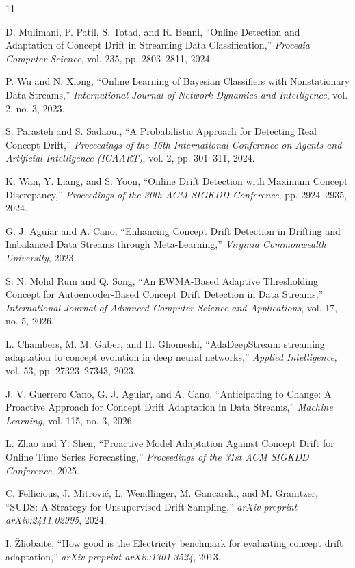 \documentclass[conference]{IEEEtran}
\begin{document}
\begin{thebibliography}{11}
\footnotesize

D. Mulimani, P. Patil, S. Totad, and R. Benni, ``Online Detection and Adaptation of Concept Drift in Streaming Data Classification,'' \textit{Procedia Computer Science}, vol. 235, pp. 2803--2811, 2024.

P. Wu and N. Xiong, ``Online Learning of Bayesian Classifiers with Nonstationary Data Streams,'' \textit{International Journal of Network Dynamics and Intelligence}, vol. 2, no. 3, 2023.

S. Parasteh and S. Sadaoui, ``A Probabilistic Approach for Detecting Real Concept Drift,'' \textit{Proceedings of the 16th International Conference on Agents and Artificial Intelligence (ICAART)}, vol. 2, pp. 301--311, 2024.

K. Wan, Y. Liang, and S. Yoon, ``Online Drift Detection with Maximum Concept Discrepancy,'' \textit{Proceedings of the 30th ACM SIGKDD Conference}, pp. 2924--2935, 2024.

G. J. Aguiar and A. Cano, ``Enhancing Concept Drift Detection in Drifting and Imbalanced Data Streams through Meta-Learning,'' \textit{Virginia Commonwealth University}, 2023.

S. N. Mohd Rum and Q. Song, ``An EWMA-Based Adaptive Thresholding Concept for Autoencoder-Based Concept Drift Detection in Data Streams,'' \textit{International Journal of Advanced Computer Science and Applications}, vol. 17, no. 5, 2026.

L. Chambers, M. M. Gaber, and H. Ghomeshi, ``AdaDeepStream: streaming adaptation to concept evolution in deep neural networks,'' \textit{Applied Intelligence}, vol. 53, pp. 27323--27343, 2023.

J. V. Guerrero Cano, G. J. Aguiar, and A. Cano, ``Anticipating to Change: A Proactive Approach for Concept Drift Adaptation in Data Streams,'' \textit{Machine Learning}, vol. 115, no. 3, 2026.

L. Zhao and Y. Shen, ``Proactive Model Adaptation Against Concept Drift for Online Time Series Forecasting,'' \textit{Proceedings of the 31st ACM SIGKDD Conference}, 2025.

C. Fellicious, J. Mitrovi\'{c}, L. Wendlinger, M. Gancarski, and M. Granitzer, ``SUDS: A Strategy for Unsupervised Drift Sampling,'' \textit{arXiv preprint arXiv:2411.02995}, 2024.

I. \v{Z}liobait\.{e}, ``How good is the Electricity benchmark for evaluating concept drift adaptation,'' \textit{arXiv preprint arXiv:1301.3524}, 2013.

\end{thebibliography}
\end{document}
